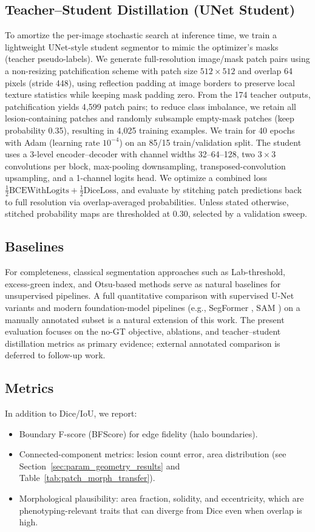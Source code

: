 \documentclass[11pt,a4paper]{article}
\begin{document}
\subsection{Teacher--Student Distillation (UNet Student)}
To amortize the per-image stochastic search at inference time, we train a lightweight UNet-style student segmentor to mimic the optimizer's masks (teacher pseudo-labels).
We generate full-resolution image/mask patch pairs using a non-resizing patchification scheme with patch size $512\times512$ and overlap 64 pixels (stride 448), using reflection padding at image borders to preserve local texture statistics while keeping mask padding zero.
From the 174 teacher outputs, patchification yields 4{,}599 patch pairs; to reduce class imbalance, we retain all lesion-containing patches and randomly subsample empty-mask patches (keep probability 0.35), resulting in 4{,}025 training examples.
We train for 40 epochs with Adam (learning rate $10^{-4}$) on an 85/15 train/validation split.
The student uses a 3-level encoder--decoder with channel widths 32--64--128, two $3\times3$ convolutions per block, max-pooling downsampling, transposed-convolution upsampling, and a 1-channel logits head.
We optimize a combined loss $\tfrac12\mathrm{BCEWithLogits} + \tfrac12\mathrm{DiceLoss}$, and evaluate by stitching patch predictions back to full resolution via overlap-averaged probabilities. Unless stated otherwise, stitched probability maps are thresholded at 0.30, selected by a validation sweep.

\subsection{Baselines}
For completeness, classical segmentation approaches such as Lab-threshold, excess-green index, and Otsu-based methods serve as natural baselines for unsupervised pipelines. A full quantitative comparison with supervised U-Net variants \citep{ronneberger2015u} and modern foundation-model pipelines (e.g., SegFormer \citep{xie2021segformer}, SAM \citep{kirillov2023segment}) on a manually annotated subset is a natural extension of this work. The present evaluation focuses on the no-GT objective, ablations, and teacher--student distillation metrics as primary evidence; external annotated comparison is deferred to follow-up work.

\subsection{Metrics}
In addition to Dice/IoU, we report:
\begin{itemize}
    \item Boundary F-score (BFScore) for edge fidelity (halo boundaries).
    \item Connected-component metrics: lesion count error, area distribution (see Section~\ref{sec:param_geometry_results} and Table~\ref{tab:patch_morph_transfer}).
    \item Morphological plausibility: area fraction, solidity, and eccentricity, which are phenotyping-relevant traits that can diverge from Dice even when overlap is high.
\end{itemize}
\end{document}
